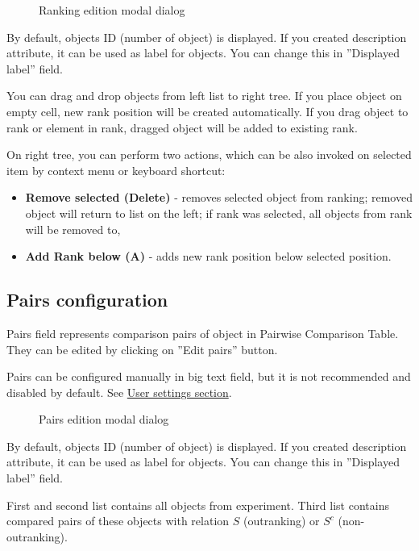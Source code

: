 \begin{figure*}[!ht] 
	\centering
	\caption{Ranking edition modal dialog}
\end{figure*}

By default, objects ID (number of object) is displayed. If you created description attribute, it can be used as label for objects. You can change this in ''Displayed label'' field.

You can drag and drop objects from left list to right tree. If you place object on empty cell, new rank position will be created automatically. If you drag object to rank or element in rank, dragged object will be added to existing rank.

On right tree, you can perform two actions, which can be also invoked on selected item by context menu or keyboard shortcut:
\begin{itemize}
	\item \textbf{Remove selected (Delete)} - removes selected object from ranking; removed object will return to list on the left; if rank was selected, all objects from rank will be removed to,
	\item \textbf{Add Rank below (A)} - adds new rank position below selected position.
\end{itemize}


\subsection{Pairs configuration}\label{sub:properties-pairs}

Pairs field represents comparison pairs of object in Pairwise Comparison Table. They can be edited by clicking on ''Edit pairs'' button.

Pairs can be configured manually in big text field, but it is not recommended and disabled by default. See \hyperref[section:user-settings]{User settings section}.

\begin{figure*}[!ht] 
	\centering
	\caption{Pairs edition modal dialog}
\end{figure*}

By default, objects ID (number of object) is displayed. If you created description attribute, it can be used as label for objects. You can change this in ''Displayed label'' field. 

First and second list contains all objects from experiment. Third list contains compared pairs of these objects with relation $S$ (outranking) or $S^{c}$ (non-outranking).

